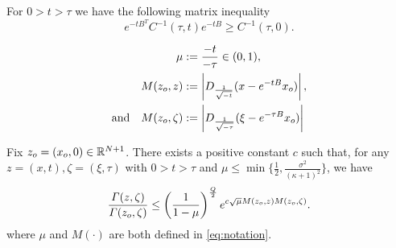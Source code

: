 \documentclass[10pt,a4paper]{amsart}
\def \r{{\mathbb{R}}}
\renewcommand{\Gamma}{\varGamma}
\begin{document}
\begin{lemma}\label{matinv}
For $0>t>\tau$ we have the following matrix inequality
$$e^{-tB^T}C^{-1}(\tau,t)e^{-tB}\geq C^{-1}(\tau,0).$$
\end{lemma}

\begin{equation}\label{eq:notation}
\begin{split}
\mu & :=\frac{-t}{-\tau}\in(0,1),\\
 {M}(z_{\rm o},z) & :=\left|D_{\frac{1}{\sqrt{-t}}}(x-e^{-tB}x_{\rm o})\right|,\\
 \text{and}\quad {M}(z_{\rm o},\zeta)& :=\left|D_{\frac{1}{\sqrt{-\tau}}}(\xi-e^{-\tau B}x_{\rm o})\right|
 \end{split}
\end{equation}

\begin{lemma}\label{rapporto}
Fix $z_{\rm o}=(x_{\rm o},0) \in \r^{N+1}$. There exists a positive constant $c$ such that, for any $z=(x,t),\zeta=(\xi,\tau)$ with $0>t>\tau$ and $\mu\leq\min{\{\frac{1}{2},\frac{\sigma^2}{(\kappa+1)^2}\}}$, we have
\[
\frac{\Gamma(z,\zeta)}{\Gamma(z_{\rm o},\zeta)}\leq\left(\frac{1}{1-\mu}\right)^{\frac{Q}{2}}e^{c\sqrt{\mu}M(z_{\rm o},z)M(z_{\rm o},\zeta)}.
\]
where $\mu$ and $M(\cdot)$ are both defined in \eqref{eq:notation}.
\end{lemma}
\end{document}
